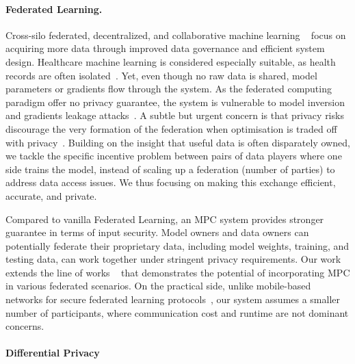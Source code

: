\paragraph{Federated Learning.}
Cross-silo federated, decentralized, and collaborative machine learning ~\cite{mcmahan2017communication, li2020federated, bonawitztowards, kairouz2021advances} focus on acquiring more data through improved data governance and efficient system design. Healthcare machine learning is considered especially suitable, as health records are often isolated~\cite{rieke2020future,xu2021federated, nguyen2022federated}. Yet, even though no raw data is shared, model parameters or gradients flow through the system. As the federated computing paradigm offer no privacy guarantee, the system is vulnerable to model inversion~\cite{geiping2020inverting} and gradients leakage attacks~\cite{boenisch2023curious, zhu2019deep}. A subtle but urgent concern is that privacy risks discourage the very formation of the federation when optimisation is traded off with privacy~\cite{lyu2022privacy,raynal2024conflict}.  %
Building on the insight that useful data is often disparately owned, we tackle the specific incentive problem between pairs of data players where one side trains the model, instead of scaling up a federation (number of parties) to address data access issues. We thus focusing on making this exchange efficient, accurate, and private.

Compared to vanilla Federated Learning, an MPC system \cite{shamir1979share, yao1982protocols, bonawitz2017practical, knott2021crypten} provides stronger guarantee in terms of input security. Model owners and data owners can potentially federate their proprietary data, including model weights, training, and testing data, can work together under stringent privacy requirements. Our work extends the line of works ~\cite{xu2022data, yang2024fedfed, bonawitz2017practical} that demonstrates the potential of incorporating MPC in various federated scenarios. On the practical side, unlike mobile-based networks for secure federated learning protocols~\cite{bonawitztowards}, our system assumes a smaller number of participants, where communication cost and runtime are not dominant concerns. 

\paragraph{Differential Privacy} 

